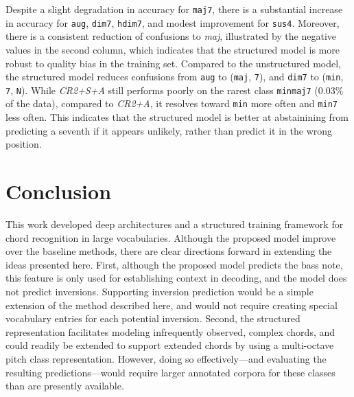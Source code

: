 \documentclass{article}
\begin{document}
Despite a slight degradation in accuracy for \texttt{maj7}, there is a substantial increase in accuracy for \texttt{aug}, \texttt{dim7}, \texttt{hdim7}, and modest improvement for \texttt{sus4}.
Moreover, there is a consistent reduction of confusions to \emph{maj}, illustrated by the negative values in the second column, which indicates that the structured model is more robust to quality bias in the training set.
Compared to the unstructured model, the structured model reduces confusions from \texttt{aug} to (\texttt{maj}, \texttt{7}), and \texttt{dim7} to (\texttt{min}, \texttt{7}, \texttt{N}).
While \emph{CR2+S+A} still performs poorly on the rarest class \texttt{minmaj7} (0.03\% of the data), compared to \emph{CR2+A}, it resolves toward \texttt{min} more often and \texttt{min7} less often.
This indicates that the structured model is better at abstainining from predicting a seventh if it appears unlikely, rather than predict it in the wrong position.


\section{Conclusion}
This work developed deep architectures and a structured training framework for chord recognition in large vocabularies.
Although the proposed model improve over the baseline methods, there are clear directions forward in extending the ideas presented here.
First, although the proposed model predicts the bass note, this feature is only used for establishing context in decoding, and the model does not predict inversions.
Supporting inversion prediction would be a simple extension of the method described here, and would not require creating special vocabulary entries for each potential inversion.
Second, the structured representation facilitates modeling infrequently observed, complex chords, and could readily be extended to support extended chords by using a multi-octave pitch class representation.
However, doing so effectively---and evaluating the resulting predictions---would require larger annotated corpora for these classes than are presently available.

%       




\end{document}
